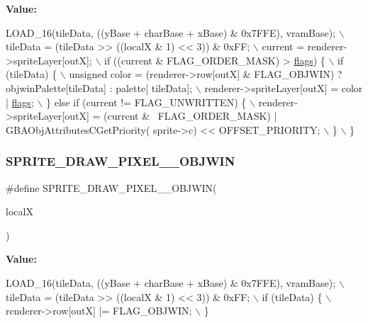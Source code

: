 {\bfseries Value\+:}
\begin{DoxyCode}
LOAD\_16(tileData, ((yBase + charBase + xBase) & 0x7FFE), vramBase);  \(\backslash\)
    tileData = (tileData >> ((localX & 1) << 3)) & 0xFF; \(\backslash\)
    current = renderer->spriteLayer[outX]; \(\backslash\)
    if ((current & FLAG\_ORDER\_MASK) > \mbox{\hyperlink{lr35902_2decoder_8c_a11f29eea941556f0630cfd3285f565c0}{flags}}) \{ \(\backslash\)
        if (tileData) \{ \(\backslash\)
            unsigned color = (renderer->row[outX] & FLAG\_OBJWIN) ? objwinPalette[tileData] : palette[
      tileData]; \(\backslash\)
            renderer->spriteLayer[outX] = color | \mbox{\hyperlink{lr35902_2decoder_8c_a11f29eea941556f0630cfd3285f565c0}{flags}}; \(\backslash\)
        \} \textcolor{keywordflow}{else} \textcolor{keywordflow}{if} (current != FLAG\_UNWRITTEN) \{ \(\backslash\)
            renderer->spriteLayer[outX] = (current & ~FLAG\_ORDER\_MASK) | GBAObjAttributesCGetPriority(
      sprite->c) << OFFSET\_PRIORITY; \(\backslash\)
        \} \(\backslash\)
    \}
\end{DoxyCode}
\mbox{\label{software-obj_8c_a68233a273978fa0c7f6fc75aa43443ee}} 
\subsubsection{\texorpdfstring{S\+P\+R\+I\+T\+E\+\_\+\+D\+R\+A\+W\+\_\+\+P\+I\+X\+E\+L\+\_\+\_\+\+O\+B\+J\+W\+IN}{SPRITE\_DRAW\_PIXEL\_256\_OBJWIN}}
{\footnotesize\ttfamily \#define S\+P\+R\+I\+T\+E\+\_\+\+D\+R\+A\+W\+\_\+\+P\+I\+X\+E\+L\+\_\+\_\+\+O\+B\+J\+W\+IN(\begin{DoxyParamCaption}\item[{}]{localX }\end{DoxyParamCaption})}

{\bfseries Value\+:}
\begin{DoxyCode}
LOAD\_16(tileData, ((yBase + charBase + xBase) & 0x7FFE), vramBase); \(\backslash\)
    tileData = (tileData >> ((localX & 1) << 3)) & 0xFF; \(\backslash\)
    if (tileData) \{ \(\backslash\)
        renderer->row[outX] |= FLAG\_OBJWIN; \(\backslash\)
    \}
\end{DoxyCode}
\mbox{\label{software-obj_8c_aaefd49556ffb9bf95e066a59b135c7e7}} 
